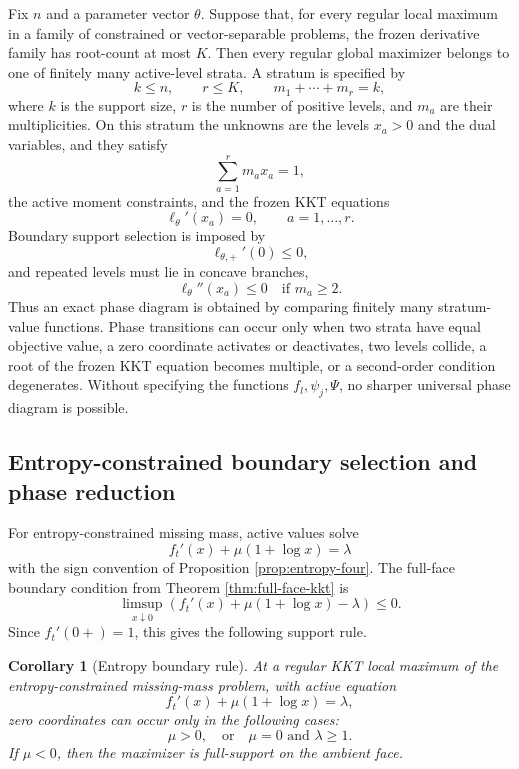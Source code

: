 \documentclass[11pt]{article}
\newtheorem{corollary}[theorem]{Corollary}
\theoremstyle{definition}
\begin{document}
Fix $n$ and a parameter vector $\theta$.  Suppose that, for every regular local maximum in a family of constrained or vector-separable problems, the frozen derivative family has root-count at most $K$.  Then every regular global maximizer belongs to one of finitely many active-level strata.  A stratum is specified by
\[
  k\le n,
  \qquad
  r\le K,
  \qquad
  m_1+\cdots+m_r=k,
\]
where $k$ is the support size, $r$ is the number of positive levels, and $m_a$ are their multiplicities.  On this stratum the unknowns are the levels $x_a>0$ and the dual variables, and they satisfy
\[
  \sum_{a=1}^r m_a x_a=1,
\]
the active moment constraints, and the frozen KKT equations
\[
  \ell_\theta'(x_a)=0,
  \qquad a=1,\ldots,r.
\]
Boundary support selection is imposed by
\[
  \ell_{\theta,+}'(0)\le0,
\]
and repeated levels must lie in concave branches,
\[
  \ell_\theta''(x_a)\le0
  \quad\text{if }m_a\ge2.
\]
Thus an exact phase diagram is obtained by comparing finitely many stratum-value functions.  Phase transitions can occur only when two strata have equal objective value, a zero coordinate activates or deactivates, two levels collide, a root of the frozen KKT equation becomes multiple, or a second-order condition degenerates.  Without specifying the functions $f_l,\psi_j,\Psi$, no sharper universal phase diagram is possible.

\subsection{Entropy-constrained boundary selection and phase reduction}\label{subsec:entropy-phase}

For entropy-constrained missing mass, active values solve
\[
  f_t'(x)+\mu(1+\log x)=\lambda
\]
with the sign convention of Proposition \ref{prop:entropy-four}.  The full-face boundary condition from Theorem \ref{thm:full-face-kkt} is
\[
  \limsup_{x\downarrow0}\left(f_t'(x)+\mu(1+\log x)-\lambda\right)\le0.
\]
Since $f_t'(0+)=1$, this gives the following support rule.

\begin{corollary}[Entropy boundary rule]\label{cor:entropy-boundary}
At a regular KKT local maximum of the entropy-constrained missing-mass problem, with active equation
\[
  f_t'(x)+\mu(1+\log x)=\lambda,
\]
zero coordinates can occur only in the following cases:
\[
  \mu>0,
  \quad\text{or}\quad
  \mu=0\text{ and }\lambda\ge1.
\]
If $\mu<0$, then the maximizer is full-support on the ambient face.
\end{corollary}
\end{document}
